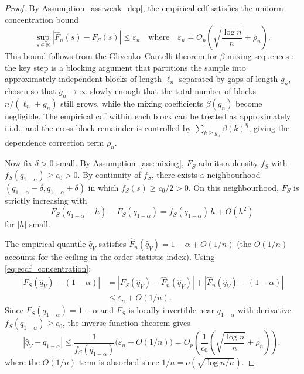 \documentclass[preprint,11pt,authoryear]{elsarticle}
\newcommand{\1}{\boldsymbol{1}}
\begin{document}
	\begin{proof}
		By Assumption~\ref{ass:weak_dep}, the empirical cdf satisfies the uniform concentration bound
		\begin{equation}\label{eq:ecdf_concentration}
			\sup_{s\in\mathbb R} |\hat F_n(s)-F_S(s)| \le \varepsilon_n
			\quad\text{where}\quad
			\varepsilon_n = O_p\!\left(\sqrt{\frac{\log n}{n}}+\rho_n\right).
		\end{equation}
		This bound follows from the Glivenko--Cantelli theorem for $\beta$-mixing sequences \citep{yu1994rates,rio2017asymptotic}: the key step is a blocking argument that partitions the sample into approximately independent blocks of length $\ell_n$ separated by gaps of length $g_n$, chosen so that $g_n \to \infty$ slowly enough that the total number of blocks $n/(\ell_n+g_n)$ still grows, while the mixing coefficients $\beta(g_n)$ become negligible. The empirical cdf within each block can be treated as approximately i.i.d., and the cross-block remainder is controlled by $\sum_{k \ge g_n}\beta(k)^\eta$, giving the dependence correction term $\rho_n$.
		
		Now fix $\delta > 0$ small. By Assumption~\ref{ass:mixing}, $F_S$ admits a density $f_S$ with $f_S(q_{1-\alpha})\ge c_0 >0$. By continuity of $f_S$, there exists a neighbourhood $(q_{1-\alpha}-\delta, q_{1-\alpha}+\delta)$ in which $f_S(s)\ge c_0/2>0$. On this neighbourhood, $F_S$ is strictly increasing with
		\[
		F_S(q_{1-\alpha}+h)-F_S(q_{1-\alpha}) = f_S(q_{1-\alpha})\,h + O(h^2)
		\]
		for $|h|$ small.
		
		The empirical quantile $\hat q_V$ satisfies $\hat F_n(\hat q_V) = 1-\alpha + O(1/n)$ (the $O(1/n)$ accounts for the ceiling in the order statistic index). Using \eqref{eq:ecdf_concentration}:
		\begin{align*}
			|F_S(\hat q_V) - (1-\alpha)|
			&= |F_S(\hat q_V) - \hat F_n(\hat q_V)| + |\hat F_n(\hat q_V)-(1-\alpha)| \\
			&\le \varepsilon_n + O(1/n).
		\end{align*}
		Since $F_S(q_{1-\alpha})=1-\alpha$ and $F_S$ is locally invertible near $q_{1-\alpha}$ with derivative $f_S(q_{1-\alpha})\ge c_0$, the inverse function theorem gives
		\[
		|\hat q_V - q_{1-\alpha}|
		\le \frac{1}{f_S(q_{1-\alpha})}\bigl(\varepsilon_n + O(1/n)\bigr)
		= O_p\!\left(\frac{1}{c_0}\left(\sqrt{\frac{\log n}{n}}+\rho_n\right)\right),
		\]
		where the $O(1/n)$ term is absorbed since $1/n = o(\sqrt{\log n / n})$.
	\end{proof}
	
\end{document}
